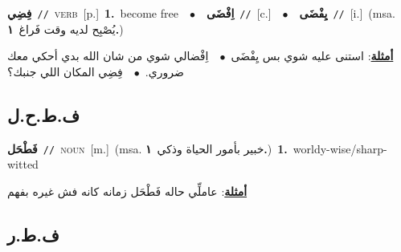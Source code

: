 \documentclass[10pt,a4paper,twoside]{article} %
\begin{document}
\begin{multicols}{2}
{\setlength\topsep{0pt}\textbf{\foreignlanguage{arabic}{فِضِي}}\ {\color{gray}\texttt{//}\color{black}}\ \textsc{verb}\ [p.]\ \textbf{1.}~become free\ \ $\bullet$\ \ \setlength\topsep{0pt}\textbf{\foreignlanguage{arabic}{اِفْضَى}}\ {\color{gray}\texttt{//}\color{black}}\ [c.]\ \ $\bullet$\ \ \setlength\topsep{0pt}\textbf{\foreignlanguage{arabic}{يِفْضَى}}\ {\color{gray}\texttt{//}\color{black}}\ [i.]\ \color{gray}(msa. \foreignlanguage{arabic}{يُصْبِح لديه وقت فَراغ}~\foreignlanguage{arabic}{\textbf{١.}})\color{black}\  \begin{flushright}\color{gray}\foreignlanguage{arabic}{\textbf{\underline{\foreignlanguage{arabic}{أمثلة}}}: استنى عليه شوي بس يِفْضَى\ $\bullet$\ \  اِفْضالي شوي من شان الله بدي أحكي معك ضروري.\ $\bullet$\ \  فِضِي المكان اللي جنبك؟}\end{flushright}\color{black}} \vspace{2mm}

\vspace{-3mm}
\subsection*{\color{blue}\foreignlanguage{arabic}{ف.ط.ح.ل}\color{blue}{}} 

{\setlength\topsep{0pt}\textbf{\foreignlanguage{arabic}{فَطْحَل}}\ {\color{gray}\texttt{//}\color{black}}\ \textsc{noun}\ [m.]\ \color{gray}(msa. \foreignlanguage{arabic}{خبير بأمور الحياة وذكي}~\foreignlanguage{arabic}{\textbf{١.}})\color{black}\ \textbf{1.}~worldy-wise/sharp-witted\  \begin{flushright}\color{gray}\foreignlanguage{arabic}{\textbf{\underline{\foreignlanguage{arabic}{أمثلة}}}: عاملِّي حاله فَطْحَل زمانه كانه فش غيره بفهم}\end{flushright}\color{black}} \vspace{2mm}

\vspace{-3mm}
\subsection*{\color{blue}\foreignlanguage{arabic}{ف.ط.ر}\color{blue}{}} 


\end{multicols}
\end{document}
